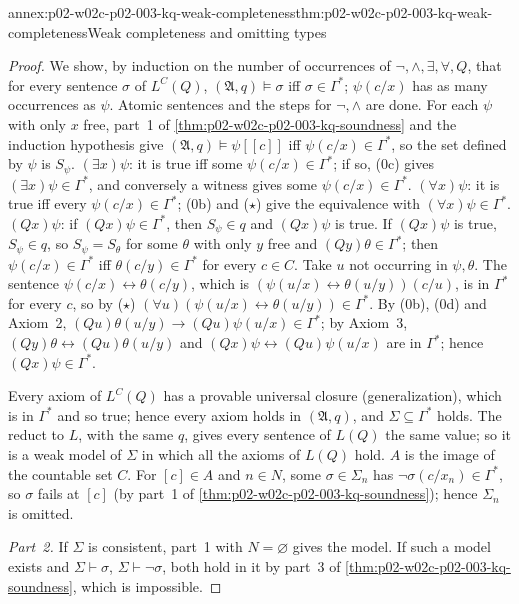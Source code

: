 \begin{annexitem}{annex:p02-w02c-p02-003-kq-weak-completeness}{thm:p02-w02c-p02-003-kq-weak-completeness}{Weak completeness and omitting types}
\begin{proof}
We show, by induction on the number of occurrences of
\(\neg,\land,\exists,\forall,Q\), that for every sentence \(\sigma\) of
\(L^{C}(Q)\), \((\mathfrak A,q)\models\sigma\) iff \(\sigma\in\Gamma^{*}\);
\(\psi(c/x)\) has as many occurrences as \(\psi\).  Atomic sentences and
the steps for \(\neg,\land\) are done.  For each \(\psi\) with only \(x\)
free, part~1 of \cref{thm:p02-w02c-p02-003-kq-soundness} and the induction
hypothesis give \((\mathfrak A,q)\models\psi[[c]]\) iff
\(\psi(c/x)\in\Gamma^{*}\), so the set defined by \(\psi\) is \(S_\psi\).
\((\exists x)\psi\): it is true iff some \(\psi(c/x)\in\Gamma^{*}\); if so,
(0c) gives \((\exists x)\psi\in\Gamma^{*}\), and conversely a witness gives
some \(\psi(c/x)\in\Gamma^{*}\).  \((\forall x)\psi\): it is true iff every
\(\psi(c/x)\in\Gamma^{*}\); (0b) and (\(\star\)) give the equivalence with
\((\forall x)\psi\in\Gamma^{*}\).  \((Qx)\psi\): if
\((Qx)\psi\in\Gamma^{*}\), then \(S_\psi\in q\) and \((Qx)\psi\) is true.
If \((Qx)\psi\) is true, \(S_\psi\in q\), so \(S_\psi=S_\theta\) for some
\(\theta\) with only \(y\) free and \((Qy)\theta\in\Gamma^{*}\); then
\(\psi(c/x)\in\Gamma^{*}\) iff \(\theta(c/y)\in\Gamma^{*}\) for every
\(c\in C\).  Take \(u\) not occurring in \(\psi,\theta\).  The sentence
\(\psi(c/x)\leftrightarrow\theta(c/y)\), which is
\((\psi(u/x)\leftrightarrow\theta(u/y))(c/u)\), is in \(\Gamma^{*}\) for
every \(c\), so by (\(\star\))
\((\forall u)(\psi(u/x)\leftrightarrow\theta(u/y))\in\Gamma^{*}\).  By (0b),
(0d) and Axiom~2, \((Qu)\theta(u/y)\to(Qu)\psi(u/x)\in\Gamma^{*}\); by
Axiom~3, \((Qy)\theta\leftrightarrow(Qu)\theta(u/y)\) and
\((Qx)\psi\leftrightarrow(Qu)\psi(u/x)\) are in \(\Gamma^{*}\); hence
\((Qx)\psi\in\Gamma^{*}\).

Every axiom of \(L^{C}(Q)\) has a provable universal closure
(generalization), which is in \(\Gamma^{*}\) and so true; hence every axiom
holds in \((\mathfrak A,q)\), and \(\Sigma\subseteq\Gamma^{*}\) holds.  The
reduct to \(L\), with the same \(q\), gives every sentence of \(L(Q)\) the
same value; so it is a weak model of \(\Sigma\) in which all the axioms of
\(L(Q)\) hold.  \(A\) is the image of the countable set \(C\).  For
\([c]\in A\) and \(n\in N\), some \(\sigma\in\Sigma_n\) has
\(\neg\sigma(c/x_n)\in\Gamma^{*}\), so \(\sigma\) fails at \([c]\) (by part~1
of \cref{thm:p02-w02c-p02-003-kq-soundness}); hence \(\Sigma_n\) is
omitted.

\emph{Part~2.}  If \(\Sigma\) is consistent, part~1 with \(N=\varnothing\)
gives the model.  If such a model exists and \(\Sigma\vdash\sigma\),
\(\Sigma\vdash\neg\sigma\), both hold in it by part~3 of
\cref{thm:p02-w02c-p02-003-kq-soundness}, which is impossible.


\end{proof}
\end{annexitem}
